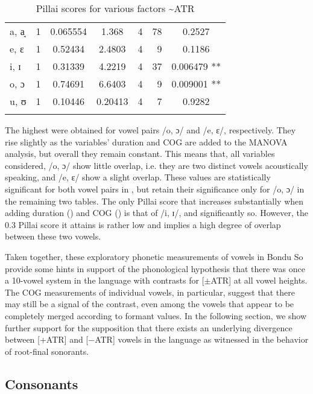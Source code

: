 \documentclass[output=paper,colorlinks,citecolor=brown]{langscibook}
\begin{document}
\begin{table}
\begin{subtable}{\textwidth}
\begin{tabular}{lc S[table-format=1.7] S[table-format=4.5] c r S[table-format=1.7{***}]}
\midrule
a, a̘ & 1 & 0.065554 & 1.368 & 4 & 78 & 0.2527 \\
e, ɛ & 1 & 0.52434  & 2.4803  & 4 & 9 & 0.1186 \\
i, ɪ & 1 & 0.31339  & 4.2219  & 4 & 37 &  0.006479 {**} \\
o, ɔ & 1 & 0.74691  & 6.6403  & 4 & 9 & 0.009001  {**} \\
u, ʊ & 1 & 0.10446 & 0.20413 & 4 & 7  & 0.9282 \\
\lspbottomrule
\end{tabular}
\label{tab:f1-f2-duration-cog}
\end{subtable}
\caption{Pillai scores for various factors \textasciitilde ATR}
\label{tab:main}
\end{table}


The highest  were obtained for vowel pairs /o, ɔ/ and /e, ɛ/, respectively. They rise slightly as the variables' duration and COG are added to the MANOVA analysis, but overall they remain constant. This means that, all variables considered, /o, ɔ/ show little overlap, i.e. they are two distinct vowels acoustically speaking, and /e, ɛ/ show a slight overlap. These values are statistically significant for both vowel pairs in , but retain their significance only for /o, ɔ/ in the remaining two tables. The only Pillai score that increases substantially when adding duration () and COG () is that of /i, ɪ/, and significantly so. However, the 0.3 Pillai score it attains is rather low and implies a high degree of overlap between these two vowels.

Taken together, these exploratory phonetic measurements of vowels in Bondu So provide some hints in support of the phonological hypothesis that there was once a 10-vowel system in the language with contrasts for [$\pm$ATR] at all vowel heights. The COG measurements of individual vowels, in particular, suggest that there may still be a signal of the contrast, even among the vowels that appear to be completely merged according to formant values. In the following section, we show further support for the supposition that there exists an underlying divergence between [+ATR] and [−ATR] vowels in the language as witnessed in the behavior of root-final sonorants. 

\subsection{Consonants}
\label{subsec-cons}
\end{document}
